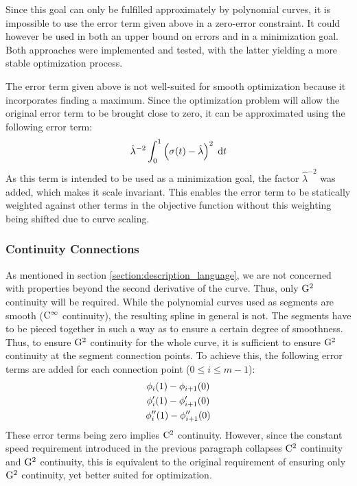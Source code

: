 \documentclass[a4paper]{article}
\begin{document}
				Since this goal can only be fulfilled approximately by polynomial curves, it is impossible to use the error term given above in a zero-error constraint. It could however be used in both an upper bound on errors and in a minimization goal. Both approaches were implemented and tested, with the latter yielding a more stable optimization process.

				The error term given above is not well-suited for smooth optimization because it incorporates finding a maximum. Since the optimization problem will allow the original error term to be brought close to zero, it can be approximated using the following error term:
				\begin{equation*}
					\hat{\lambda}^{-2}\int_{0}^{1} \left( \sigma\!\left( t \right) - \hat{\lambda} \right)^2 \; \mathrm{d}t
				\end{equation*}
				As this term is intended to be used as a minimization goal, the factor \(\hat{\lambda}^{-2}\) was added, which makes it scale invariant. This enables the error term to be statically weighted against other terms in the objective function without this weighting being shifted due to curve scaling.

			\subsubsection{Continuity Connections}
			\label{section:continuity_connections}

				As mentioned in section \ref{section:description_language}, we are not concerned with properties beyond the second derivative of the curve. Thus, only \(\mathrm{G}^{2}\) continuity will be required. While the polynomial curves used as segments are smooth (\(\mathrm{C}^{\infty}\) continuity), the resulting spline in general is not. The segments have to be pieced together in such a way as to ensure a certain degree of smoothness. Thus, to ensure \(\mathrm{G}^{2}\) continuity for the whole curve, it is sufficient to ensure \(\mathrm{G}^{2}\) continuity at the segment connection points. To achieve this, the following error terms are added for each connection point (\(0 \leq i \leq m - 1\)):
				\begin{equation*}
					\begin{gathered}
						\phi_i\!\left( 1 \right) - \phi_{i + 1}\!\left( 0 \right)\\
						\phi'_i\!\left( 1 \right) - \phi'_{i + 1}\!\left( 0 \right)\\
						\phi''_i\!\left( 1 \right) - \phi''_{i + 1}\!\left( 0 \right)
					\end{gathered}
				\end{equation*}
				These error terms being zero implies \(\mathrm{C}^{2}\) continuity. However, since the constant speed requirement introduced in the previous paragraph collapses \(\mathrm{C}^{2}\) continuity and \(\mathrm{G}^{2}\) continuity, this is equivalent to the original requirement of ensuring only \(\mathrm{G}^{2}\) continuity, yet better suited for optimization. 
\end{document}
